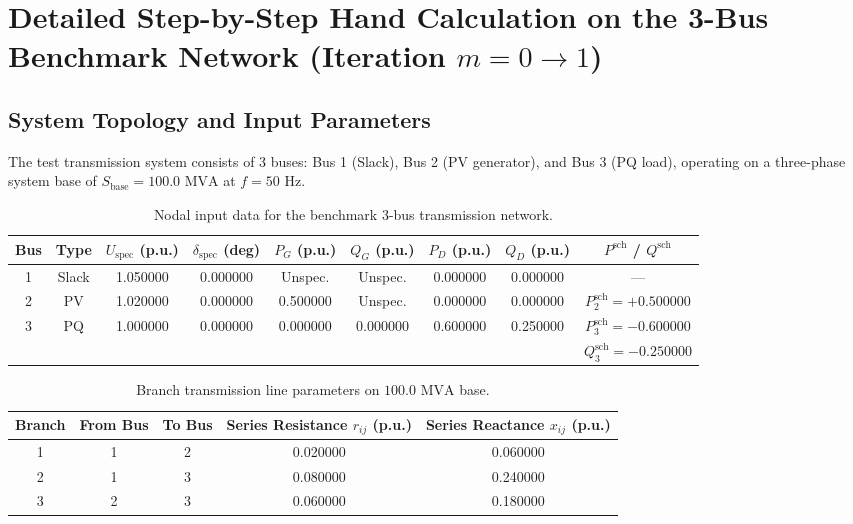 \documentclass[12pt,a4paper,oneside]{report}
\begin{document}
\section{Detailed Step-by-Step Hand Calculation on the 3-Bus Benchmark Network (Iteration $m = 0 \to 1$)}

\subsection{System Topology and Input Parameters}
The test transmission system consists of 3 buses: Bus 1 (Slack), Bus 2 (PV generator), and Bus 3 (PQ load), operating on a three-phase system base of $S_{\text{base}} = 100.0\text{ MVA}$ at $f = 50\text{ Hz}$.

\begin{table}[H]
\centering
\caption{Nodal input data for the benchmark 3-bus transmission network.}
\label{tab:3bus_bus_data}
\begin{tabular}{ccccccccc}
\toprule
\textbf{Bus} & \textbf{Type} & \textbf{$U_{\text{spec}}$ (p.u.)} & \textbf{$\delta_{\text{spec}}$ (deg)} & \textbf{$P_G$ (p.u.)} & \textbf{$Q_G$ (p.u.)} & \textbf{$P_D$ (p.u.)} & \textbf{$Q_D$ (p.u.)} & \textbf{$P^{\text{sch}}$ / $Q^{\text{sch}}$} \\
\midrule
1 & Slack & 1.050000 & 0.000000 & Unspec. & Unspec. & 0.000000 & 0.000000 & --- \\
2 & PV & 1.020000 & 0.000000 & 0.500000 & Unspec. & 0.000000 & 0.000000 & $P_2^{\text{sch}} = +0.500000$ \\
3 & PQ & 1.000000 & 0.000000 & 0.000000 & 0.000000 & 0.600000 & 0.250000 & $P_3^{\text{sch}} = -0.600000$ \\
  &    &          &          &          &          &          &          & $Q_3^{\text{sch}} = -0.250000$ \\
\bottomrule
\end{tabular}
\end{table}

\begin{table}[H]
\centering
\caption{Branch transmission line parameters on $100.0\text{ MVA}$ base.}
\label{tab:3bus_line_data}
\begin{tabular}{ccccc}
\toprule
\textbf{Branch} & \textbf{From Bus} & \textbf{To Bus} & \textbf{Series Resistance $r_{ij}$ (p.u.)} & \textbf{Series Reactance $x_{ij}$ (p.u.)} \\
\midrule
1 & 1 & 2 & 0.020000 & 0.060000 \\
2 & 1 & 3 & 0.080000 & 0.240000 \\
3 & 2 & 3 & 0.060000 & 0.180000 \\
\bottomrule
\end{tabular}
\end{table}
\end{document}
